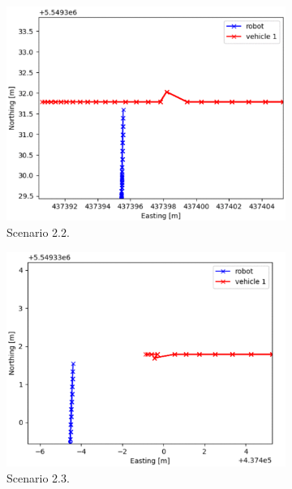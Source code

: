 \begin{figure}[H]
            \begin{subfigure}{0.49\linewidth}
                \centering
                \includegraphics[width=\linewidth]{images/simulations/closest_2_2.png}
                \caption{Scenario 2.2.}
            \end{subfigure}
            \begin{subfigure}{0.49\linewidth}
                \centering
                \includegraphics[width=\linewidth]{images/simulations/closest_2_3.png}
                \caption{Scenario 2.3.}
            \end{subfigure}
            \begin{subfigure}{0.49\linewidth}

\end{subfigure}
\end{figure}
